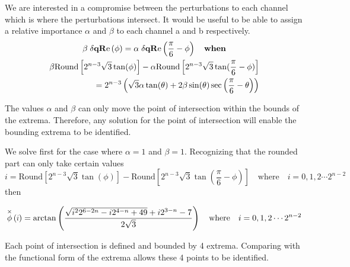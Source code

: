 We are interested in a compromise between the perturbations to each channel which is where the perturbations intersect. It would be useful to be able to assign a relative importance $\alpha$ and $\beta$ to each channel a and b respectively. 
\begin{gather*}
\beta \; \dqRe[\phi] = \alpha \; \dqRe[\frac{\pi}{6} -\phi]  \quad \textbf{when} \\
\begin{split}
\beta \text{Round}\left[ 2^{n-3}\sqrt{3} \tan (\phi ) \right] - \alpha \text{Round}\left[ 2^{n-3}\sqrt{3} \tan (\frac{\pi}{6} - \phi ) \right] \\
=   2^{n-3} \left(\sqrt{3} \alpha  \tan (\theta ) + 2 \beta  \sin (\theta ) \sec \left(\frac{\pi }{6}-\theta \right)\right)
\end{split}
\end{gather*}

The values $\alpha$ and $\beta$ can only move the point of intersection within the bounds of the extrema. Therefore, any solution for the point of intersection will enable the bounding extrema to be identified. 

We solve first for the case where $\alpha=1$ and $\beta=1$. Recognizing that the rounded part can only take certain values
\begin{equation}
i =  \text{Round}\left[ 2^{n-3}\sqrt{3} \tan (\phi ) \right] - \text{Round}\left[ 2^{n-3}\sqrt{3} \tan (\frac{\pi}{6} - \phi ) \right]
 \quad \text{where}\quad i=0,1,2 \cdots 2^{n-2}
 \end{equation}
then


\begin{gather*}
\thetaX{i}=\arctan\left(\frac{\sqrt{i^2 2^{6-2 n}-i 2^{4-n}+49}+i 2^{3-n}-7}{2 \sqrt{3}}\right) \quad \text{where}\quad i=0,1,2 \cdots 2^{n-2}
\end{gather*}

Each point of intersection is defined and bounded by 4 extrema. Comparing with the functional form of the extrema allows these 4 points to be identified.
%
%


